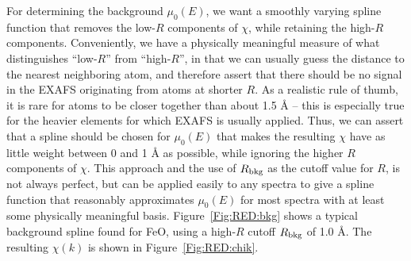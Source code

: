For determining the background $\mu_0(E)$, we want a smoothly varying
spline function that removes the low-$R$ components of $\chi$, while
retaining the high-$R$ components.  Conveniently, we have a physically
meaningful measure of what distinguishes ``low-$R$'' from ``high-$R$'', in
that we can usually guess the distance to the nearest neighboring atom, and
therefore assert that there should be no signal in the EXAFS originating
from atoms at shorter $R$.  As a realistic rule of thumb, it is rare for
atoms to be closer together than about 1.5 {\AA} -- this is especially true
for the heavier elements for which EXAFS is usually applied.  Thus, we can
assert that a spline should be chosen for $\mu_0(E)$ that makes the
resulting $\chi$ have as little weight between 0 and 1 {\AA} as possible,
while ignoring the higher $R$ components of $\chi$.  This approach and the
use of $R_{\rm bkg}$ as the cutoff value for $R$\cite{autobk}, is not
always perfect, but can be applied easily to any spectra to give a spline
function that reasonably approximates $\mu_0(E)$ for most spectra with at
least some physically meaningful basis.  Figure~\ref{Fig:RED:bkg} shows a
typical background spline found for FeO, using a high-$R$ cutoff $R_{\rm
  bkg}$ of 1.0 {\AA}.  The resulting $\chi(k)$ is shown in
Figure~\ref{Fig:RED:chik}.


